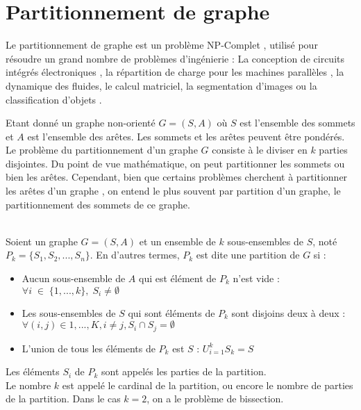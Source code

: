 
\section{Partitionnement de graphe}
Le partitionnement de graphe est un problème NP-Complet \citep{GAREY1976}, utilisé pour résoudre un grand nombre de problèmes d'ingénierie : La conception de circuits intégrés électroniques \citep{CONG2003}, la répartition de charge pour les machines parallèles \citep{BARAT2016}, la dynamique des fluides, le calcul matriciel, la segmentation d'images \citep{GRADY2006} ou la classification d'objets \citep{DHILLON2007}.

Etant donné un graphe non-orienté $G = (S, A)$ où $S$ est l'ensemble des sommets et $A$ est l'ensemble des arêtes. Les sommets et les arêtes peuvent être pondérés. Le problème du partitionnement d'un graphe $G$ consiste à le diviser en $k$ parties disjointes. Du point de vue mathématique, on peut partitionner les sommets ou bien les arêtes. Cependant, bien que certains problèmes cherchent à partitionner les arêtes d'un graphe \citep{HOLYER1981}, on entend le plus souvent par partition d'un graphe, le partitionnement des sommets de ce graphe.

\begin{definition} \citep{BichotSiarry2013}
\\Soient un graphe $G = (S,A)$ et un ensemble de $k$ sous-ensembles de $S$, noté $P_k = \{S_1, S_2, . . . ,S_n\}$. En d'autres termes, $P_k$ est dite une partition de $G$ si :
\begin{itemize}
	\item Aucun sous-ensemble de $A$ qui est élément de $P_k$ n'est vide : $\forall i\; \in \; \{1, ..., k\},\; S_i \ne \emptyset$
	\item Les sous-ensembles de $S$ qui sont éléments de $P_k$ sont disjoins deux à deux : $\forall(i, j) \in{1, ..., K}, i \ne j, S_i \cap S_j = \emptyset$
	\item L'union de tous les éléments de $P_k$  est $S$ : $U^{k}_{i=1} S_k = S$
\end{itemize}
Les éléments $S_i$ de $P_k$ sont appelés les parties de la partition.\\
Le nombre $k$ est appelé le cardinal de la partition, ou encore le nombre de parties de la partition.
Dans le cas $k = 2$, on a le problème de bissection.
\end{definition}